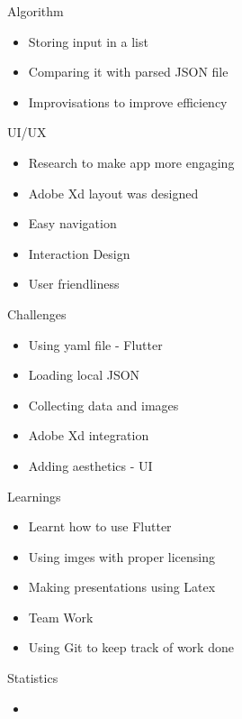\documentclass[14pt]{beamer}
\begin{document}
\begin{frame}{Algorithm}
    \begin{itemize}
        \item Storing input in a list
        \item Comparing it with parsed JSON file
        \item Improvisations to improve efficiency 
    \end{itemize}
\end{frame}

\begin{frame}{UI/UX}
    \begin{itemize}
        \item Research to make app more engaging
        \item Adobe Xd layout was designed 
        \item Easy navigation
        \item Interaction Design
        \item User friendliness
    \end{itemize}
\end{frame}

\begin{frame}{Challenges}
    \begin{itemize}
        \item Using yaml file - Flutter
        \item Loading local JSON
        \item Collecting data and images
        \item Adobe Xd integration
        \item Adding aesthetics - UI
    \end{itemize}
\end{frame}

\begin{frame}{Learnings}
    \begin{itemize}
        \item Learnt how to use Flutter
        \item Using imges with proper licensing
        \item Making presentations using Latex
        \item Team Work
        \item Using Git to keep track of work done
    \end{itemize}
\end{frame}

\begin{frame}{Statistics}
    \begin{itemize}
        \item 
    \end{itemize}
\end{frame}
\end{document}
